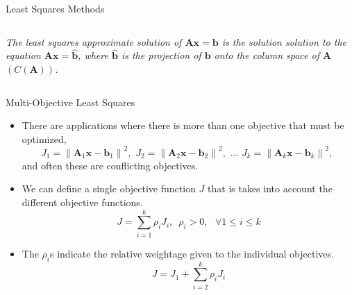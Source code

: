 \documentclass[aspectratio=169]{beamer}
\let\olditem\item
\renewcommand{\item}{\setlength{\itemsep}{\fill}\olditem}
\begin{document}
\begin{frame}[t]{Least Squares Methods}
\begin{columns}
\begin{column}{0.55\textwidth}
\begin{footnotesize}
\textit{The least squares approximate solution of $\mathbf{Ax} = \mathbf{b}$ is the solution solution to the equation $\mathbf{Ax} = \hat{\mathbf{b}}$, where $\hat{\mathbf{b}}$ is the projection of $\mathbf{b}$ onto the column space of $\mathbf{A}$ $\left(C\left(\mathbf{A}\right)\right)$.}
\end{footnotesize}
\end{column}
\end{columns}
\end{frame}


\begin{frame}[t]{Multi-Objective Least Squares}
\begin{small}
\begin{itemize}
    \item There are applications where there is more than one objective that must be optimized,
    \[ J_1 = \left\lVert \mathbf{A}_1\mathbf{x} - \mathbf{b}_1 \right\rVert^2, \,\,
    J_2 = \left\lVert \mathbf{A}_2\mathbf{x} - \mathbf{b}_2 \right\rVert^2, \,\,
    \ldots \,\,
    J_k = \left\lVert \mathbf{A}_k\mathbf{x} - \mathbf{b}_k \right\rVert^2, \,\,
    \]
    and often these are conflicting objectives.

    \item We can define a single objective function $J$ that is takes into account the different objective functions.
    \[ J = \sum_{i=1}^k\rho_iJ_i, \,\,\, \rho_i > 0, \,\,\,\, \forall 1 \leq i \leq k\]

    \item The $\rho_i$s indicate the relative weightage given to the individual objectives.
    \[ J = J_1 + \sum_{i=2}^k\rho_iJ_i \]
\end{itemize}
\end{small}
\end{frame}
\end{document}
